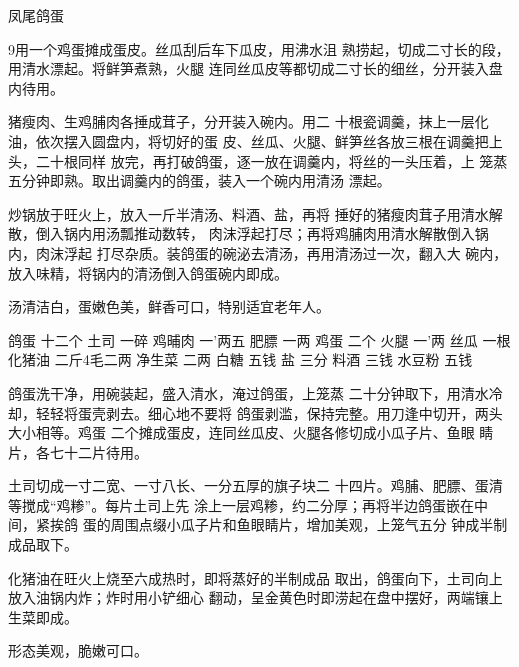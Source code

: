 \begin{recipe}{凤尾鸽蛋}

\ingredients


\cooking

\step 9用一个鸡蛋摊成蛋皮。丝瓜刮后车下瓜皮，用沸水沮 熟捞起，切成二寸长的段，用清水漂起。将鲜笋煮熟，火腿 连同丝瓜皮等都切成二寸长的细丝，分开装入盘内待用。

\step 猪瘦肉、生鸡脯肉各捶成茸子，分开装入碗内。用二 十根瓷调羹，抹上一层化油，依次摆入圆盘内，将切好的蛋 皮、丝瓜、火腿、鲜笋丝各放三根在调羹把上头，二十根同样 放完，再打破鸽蛋，逐一放在调羹内，将丝的一头压着，上 笼蒸五分钟即熟。取出调羹内的鸽蛋，装入一个碗内用清汤 漂起。

炒锅放于旺火上，放入一斤半清汤、料酒、盐，再将 捶好的猪瘦肉茸子用清水解散，倒入锅内用汤瓢推动数转， 肉沫浮起打尽；再将鸡脯肉用清水解散倒入锅内，肉沫浮起 打尽杂质。装鸽蛋的碗泌去清汤，再用清汤过一次，翻入大 碗内，放入味精，将锅内的清汤倒入鸽蛋碗内即成。

\notes

汤清洁白，蛋嫩色美，鲜香可口，特别适宜老年人。

鸽蛋	十二个	土司	一碎
鸡晡肉	一'两五	肥膘	一两
鸡蛋	二个	火腿	一'两
丝瓜	一根	化猪油	二斤4毛二两
净生菜	二两	白糖	五钱
盐	三分	料酒	三钱
水豆粉	五钱

\cooking

\step 鸽蛋洗干净，用碗装起，盛入清水，淹过鸽蛋，上笼蒸 二十分钟取下，用清水冷却，轻轻将蛋壳剥去。细心地不要将 鸽蛋剥滥，保持完整。用刀逢中切开，两头大小相等。鸡蛋 二个摊成蛋皮，连同丝瓜皮、火腿各修切成小瓜子片、鱼眼 睛片，各七十二片待用。

土司切成一寸二宽、一寸八长、一分五厚的旗子块二 十四片。鸡脯、肥膘、蛋清等搅成“鸡糁”。每片土司上先 涂上一层鸡糁，约二分厚；再将半边鸽蛋嵌在中间，紧挨鸽 蛋的周围点缀小瓜子片和鱼眼睛片，增加美观，上笼气五分 钟成半制成品取下。

化猪油在旺火上烧至六成热时，即将蒸好的半制成品 取出，鸽蛋向下，土司向上放入油锅内炸；炸时用小铲细心 翻动，呈金黄色时即涝起在盘中摆好，两端镶上生菜即成。

\notes

形态美观，脆嫩可口。

\end{recipe}

